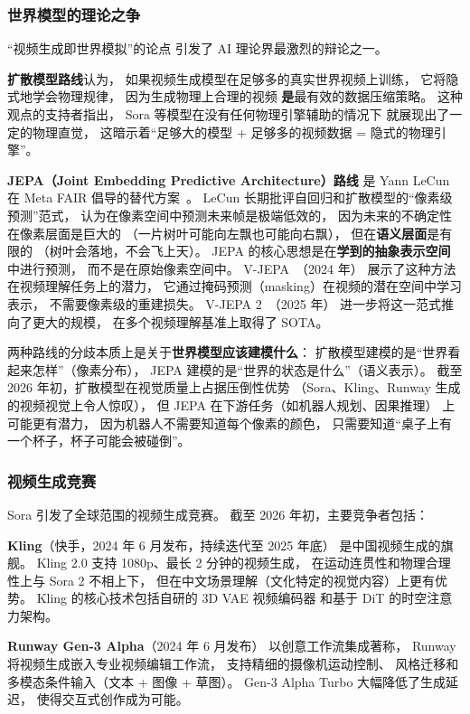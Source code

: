 \subsubsection{世界模型的理论之争}

“视频生成即世界模拟”的论点
引发了 AI 理论界最激烈的辩论之一。

\textbf{扩散模型路线}认为，
如果视频生成模型在足够多的真实世界视频上训练，
它将隐式地学会物理规律，
因为生成物理上合理的视频
\textbf{是}最有效的数据压缩策略。
这种观点的支持者指出，
Sora 等模型在没有任何物理引擎辅助的情况下
就展现出了一定的物理直觉，
这暗示着“足够大的模型 + 足够多的视频数据
= 隐式的物理引擎”。

\textbf{JEPA（Joint Embedding Predictive Architecture）路线}
是 Yann LeCun 在 Meta FAIR 倡导的替代方案~\cite{lecun2022path}。
LeCun 长期批评自回归和扩散模型的“像素级预测”范式，
认为在像素空间中预测未来帧是极端低效的，
因为未来的不确定性在像素层面是巨大的
（一片树叶可能向左飘也可能向右飘），
但在\textbf{语义层面}是有限的
（树叶会落地，不会飞上天）。
JEPA 的核心思想是在\textbf{学到的抽象表示空间}中进行预测，
而不是在原始像素空间中。
V-JEPA~\cite{bardes2024vjepa}（2024 年）
展示了这种方法在视频理解任务上的潜力，
它通过掩码预测（masking）在视频的潜在空间中学习表示，
不需要像素级的重建损失。
V-JEPA 2~\cite{vjepa2_2025}（2025 年）
进一步将这一范式推向了更大的规模，
在多个视频理解基准上取得了 SOTA。

两种路线的分歧本质上是关于\textbf{世界模型应该建模什么}：
扩散模型建模的是“世界看起来怎样”（像素分布），
JEPA 建模的是“世界的状态是什么”（语义表示）。
截至 2026 年初，扩散模型在视觉质量上占据压倒性优势
（Sora、Kling、Runway 生成的视频视觉上令人惊叹），
但 JEPA 在下游任务（如机器人规划、因果推理）
上可能更有潜力，
因为机器人不需要知道每个像素的颜色，
只需要知道“桌子上有一个杯子，杯子可能会被碰倒”。

\subsubsection{视频生成竞赛}

Sora 引发了全球范围的视频生成竞赛。
截至 2026 年初，主要竞争者包括：

\textbf{Kling}（快手，2024 年 6 月发布，持续迭代至 2025 年底）
是中国视频生成的旗舰。
Kling 2.0 支持 1080p、最长 2 分钟的视频生成，
在运动连贯性和物理合理性上与 Sora 2 不相上下，
但在中文场景理解（文化特定的视觉内容）上更有优势。
Kling 的核心技术包括自研的 3D VAE 视频编码器
和基于 DiT 的时空注意力架构。

\textbf{Runway Gen-3 Alpha}（2024 年 6 月发布）
以创意工作流集成著称，
Runway 将视频生成嵌入专业视频编辑工作流，
支持精细的摄像机运动控制、
风格迁移和多模态条件输入（文本 + 图像 + 草图）。
Gen-3 Alpha Turbo 大幅降低了生成延迟，
使得交互式创作成为可能。

